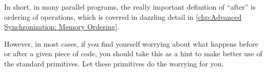In short, in many parallel programs, the really important definition
of ``after'' is ordering of operations, which is covered in dazzling
detail in
\cref{chp:Advanced Synchronization: Memory Ordering}.

However, in most cases, if you find yourself worrying about what happens
before or after a given piece of code, you should take this as a hint to
make better use of the standard primitives.
Let these primitives do the worrying for you.
